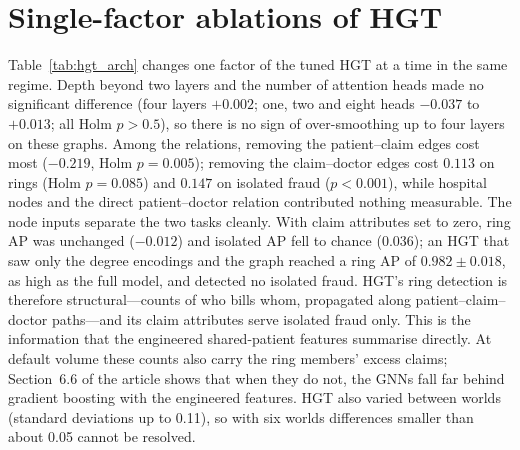\documentclass[pdflatex,sn-vancouver-num]{sn-jnl}
\newcommand{\MainSecLowVolume}{6.6}
\begin{document}
\section{Single-factor ablations of HGT}\label{sec:hgtarch}
Table~\ref{tab:hgt_arch} changes one factor of the tuned HGT at a time in
the same regime. Depth beyond two layers and the number of attention heads
made no significant difference (four layers $+0.002$; one, two and eight
heads $-0.037$ to $+0.013$; all Holm $p>0.5$), so there is no sign of
over-smoothing up to four layers on these graphs. Among the relations,
removing the patient--claim edges cost most ($-0.219$, Holm $p=0.005$);
removing the claim--doctor edges cost $0.113$ on rings (Holm $p=0.085$) and
$0.147$ on isolated fraud ($p<0.001$), while hospital nodes and the direct
patient--doctor relation contributed nothing measurable. The node inputs
separate the two tasks cleanly. With claim attributes set to zero, ring AP
was unchanged ($-0.012$) and isolated AP fell to chance (0.036); an HGT that
saw only the degree encodings and the graph reached a ring AP of
$0.982\pm0.018$, as high as the full model, and detected no isolated fraud.
HGT's ring detection is therefore structural---counts of who bills whom,
propagated along patient--claim--doctor paths---and its claim attributes
serve isolated fraud only. This is the information that the engineered
shared-patient features summarise directly. At default volume these counts
also carry the ring members' excess claims; Section~\MainSecLowVolume{} of the article
shows that when they do not, the GNNs fall far behind gradient boosting with
the engineered features. HGT also varied between worlds
(standard deviations up to 0.11), so with six worlds differences smaller than
about 0.05 cannot be resolved.
\end{document}
